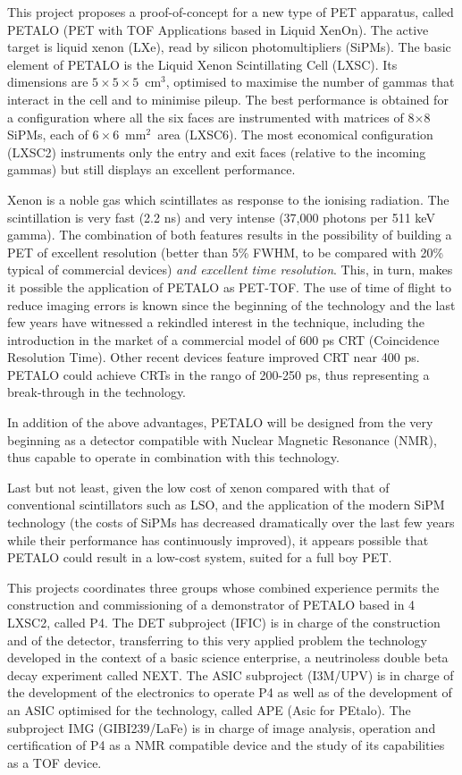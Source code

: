 This project proposes a proof-of-concept for a new type of PET apparatus, called
PETALO (PET with TOF Applications based in Liquid XenOn). The active target is liquid xenon (LXe), read by silicon photomultipliers (SiPMs). The basic element of PETALO is the Liquid Xenon Scintillating Cell (LXSC). Its dimensions are $5\times 5 \times 5$~cm$^3$, optimised to maximise the number of gammas that interact in the cell and to minimise pileup. The best performance is obtained for a configuration where all the six faces are instrumented with matrices of  8$\times$8 SiPMs, each of $6 \times 6$~mm$^2$~area (LXSC6). The most economical configuration (LXSC2) instruments only the entry and exit faces (relative to the incoming gammas) but still displays an excellent performance. 

Xenon is a noble gas which scintillates as response to the ionising radiation. The scintillation is very fast (2.2 ns) and very intense (37,000 photons per 511 keV gamma). The combination of both features results in the possibility of building a PET of excellent resolution (better than 5\% FWHM, to be compared with 20\% typical of commercial devices) {\em and excellent time resolution}. This, in turn, makes it possible the application of PETALO as PET-TOF. The use of time of flight to reduce imaging errors is known since the beginning of the technology and the last few years have witnessed a rekindled interest in the technique, including the introduction in the market of a commercial model of 600 ps CRT (Coincidence Resolution Time). Other recent devices feature improved CRT near 400 ps. PETALO could achieve CRTs in the rango of 200-250 ps, thus representing a break-through in the technology.  

In addition of the above advantages, PETALO will be designed from the very beginning as a detector compatible with Nuclear Magnetic Resonance (NMR), thus capable to operate in combination with this technology. 

Last but not least, given the low cost of xenon compared with that of conventional scintillators such as LSO, and the application of the modern SiPM technology (the costs of SiPMs has decreased dramatically over the last few years while their performance has continuously improved), it appears possible that PETALO could result in a low-cost system, suited for a full boy PET.

This projects coordinates three groups whose combined experience permits the construction and commissioning of a demonstrator of PETALO based in 4 LXSC2, called P4. The DET subproject (IFIC) is in charge of the construction and of the detector, transferring to this very applied problem the technology developed in the context of a basic science enterprise, a neutrinoless double beta decay experiment called NEXT. The ASIC subproject (I3M/UPV) is in charge of the development of the electronics to operate P4 as well as of the development of an ASIC optimised for the technology, called APE (Asic for PEtalo). The subproject IMG 
(GIBI239/LaFe) is in charge of image analysis, operation and certification of P4 as a NMR compatible device and the study of its capabilities as a TOF device. 
 



